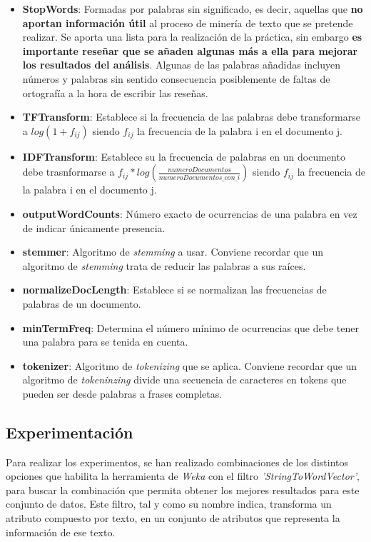 \documentclass[12pt,a4paper, xcolor=table]{article}
\begin{document}
          \begin{itemize}
          \item \textbf{StopWords}: Formadas por palabras sin significado, es decir, aquellas que \textbf{no aportan información útil} al proceso de minería de texto que se pretende realizar. Se aporta una lista para la realización de la práctica, sin embargo \textbf{es importante reseñar que se añaden algunas más a ella para mejorar los resultados del análisis}. Algunas de las palabras añadidas incluyen números y palabras sin sentido consecuencia posiblemente de faltas de ortografía a la hora de escribir las reseñas.

          \item \textbf{TFTransform}: Establece si la frecuencia de las palabras debe transformarse a $log(1+f_{ij})$ siendo $f_{ij}$ la frecuencia de la palabra i en el documento j.
          \item \textbf{IDFTransform}: Establece su la frecuencia de palabras en un documento debe trasnformarse a $f_{ij} * log(\frac{numeroDocumentos}{numeroDocumentos\_con\_i})$ siendo $f_{ij}$ la frecuencia de la palabra i en el documento j.
          \item \textbf{outputWordCounts}: Número exacto de ocurrencias de una palabra en vez de indicar únicamente presencia.
          \item \textbf{stemmer}: Algoritmo de \textit{stemming} a usar. Conviene recordar que un algoritmo de \textit{stemming} trata de reducir las palabras a sus raíces.
          \item \textbf{normalizeDocLength}: Establece si se normalizan las frecuencias de palabras de un documento.
          \item \textbf{minTermFreq}: Determina el número mínimo de ocurrencias que debe tener una palabra para se tenida en cuenta.
          \item \textbf{tokenizer}: Algoritmo de \textit{tokenizing} que se aplica. Conviene recordar que un algoritmo de \textit{tokeninzing} divide una secuencia de caracteres en tokens que pueden ser desde palabras a frases completas.

          \end{itemize}

      \subsection{Experimentación}
        Para realizar los experimentos, se han realizado combinaciones de los distintos opciones que habilita la herramienta de \textit{Weka} con el filtro \textit{'StringToWordVector'}, para buscar la combinación que permita obtener los mejores resultados para este conjunto de datos. Este filtro, tal y como su nombre indica, transforma un atributo compuesto por texto, en un conjunto de atributos que representa la información de ese texto.
\end{document}
